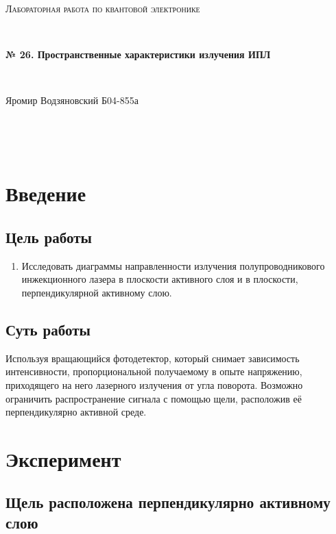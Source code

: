 \documentclass[a4paper]{article}
\begin{document}
\graphicspath{ {pictures/} }
\begin{center}
    {\scshape\Large Лабораторная работа по квантовой электронике} \par

    \

    {\huge\bfseries № 26. Пространственные характеристики излучения ИПЛ} \par 

    \

    {\large Яромир Водзяновский Б04-855а}
\end{center}

\

\
\section{Введение}

\subsection{Цель работы} 
\begin{enumerate}
    \item Исследовать диаграммы направленности излучения полупроводникового инжекционного лазера в плоскости активного слоя и в плоскости, перпендикулярной активному слою.
\end{enumerate}

\subsection{Суть работы}

Используя вращающийся фотодетектор, который снимает зависимость интенсивности, пропорциональной получаемому в опыте напряжению, приходящего на него лазерного излучения от угла поворота. 
Возможно ограничить распространение сигнала с помощью щели, расположив её перпендикулярно активной среде.
    
\section{Эксперимент}

\subsection{Щель расположена перпендикулярно активному слою}
\end{document}
